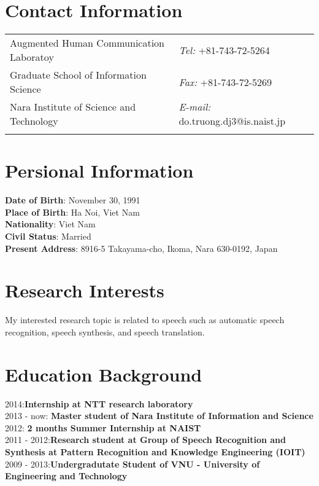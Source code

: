 \documentclass[margin,line]{res}
\newcommand{\tab}{\hspace*{2em}}
\begin{document}

\begin{resume}
\section{\sc Contact Information}
\vspace{.05in}
\begin{tabular}{@{}p{2in}p{4in}}
Augmented Human Communication Laboratoy            & {\it Tel:}  +81-743-72-5264 \\            
Graduate School of Information Science   & {\it Fax:}    +81-743-72-5269 \\         
Nara Institute of Science and Technology & {\it E-mail:}  do.truong.dj3@is.naist.jp\\       
  & 	%
\end{tabular}

\section{\sc Persional Information}
\textbf{Date of Birth}: 		November 30, 1991	\\
\textbf{Place of Birth}: 	Ha Noi, Viet Nam	\\
\textbf{Nationality}:		Viet Nam	\\
\textbf{Civil Status}:		Married	\\
\textbf{Present Address}:	8916-5 Takayama-cho, Ikoma, Nara 630-0192, Japan	\\

\section{\sc Research Interests}
My interested research topic is related to speech such as automatic speech recognition, speech synthesis, and speech translation.
\section{\sc Education Background}
2014:\tab \tab \hspace{1.1em}\textbf{Internship at NTT research laboratory} \\
2013 - now: \tab \textbf{Master student of Nara Institute of Information and Science} \\
2012:\tab \tab \hspace{0.7em} \textbf{2 months Summer Internship at NAIST}\\
2011 - 2012:\tab \textbf{Research student at Group of Speech Recognition and Synthesis at Pattern Recognition and Knowledge Engineering (IOIT)}\\
2009 - 2013:\tab \textbf{Undergradutate Student of VNU - University of Engineering and Technology}\\

\end{resume}
\end{document}
